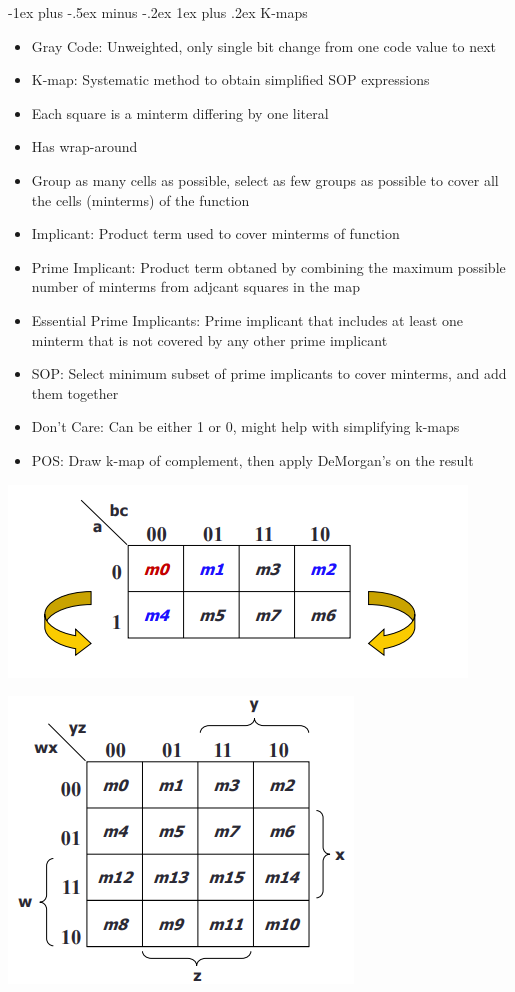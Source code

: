 \documentclass[10pt, portrait]{article}
\makeatletter
\renewcommand{\subsection}{\@startsection{subsection}{3}{0mm}%
                                {-1ex plus -.5ex minus -.2ex}%
                                {1ex plus .2ex}%
                                {\normalfont\small\bfseries}}%
\makeatother
\begin{document}
\begin{multicols*}{2}
\subsection{K-maps}
\begin{itemize}
    \item Gray Code: Unweighted, only single bit change from one code value to next
    \item K-map: Systematic method to obtain simplified SOP expressions
    \item Each square is a minterm differing by one literal
    \item Has wrap-around
    \item Group as many cells as possible, select as few groups as possible to cover all the cells (minterms) of the function
    \item Implicant: Product term used to cover minterms of function
    \item Prime Implicant: Product term obtaned by combining the maximum possible number of minterms from adjcant squares in the map
    \item Essential Prime Implicants: Prime implicant that includes at least one minterm that is not covered by any other prime implicant
    \item SOP: Select minimum subset of prime implicants to cover minterms, and add them together
    \item Don't Care: Can be either 1 or 0, might help with simplifying k-maps
    \item POS: Draw k-map of complement, then apply DeMorgan's on the result
\end{itemize}

\begin{center}
    \includegraphics[width=0.7\linewidth]{3varkmap.png}
\end{center}
\begin{center}
    \includegraphics[width=0.7\linewidth]{4varkmap.png}
\end{center}



\end{multicols*}
\end{document}
